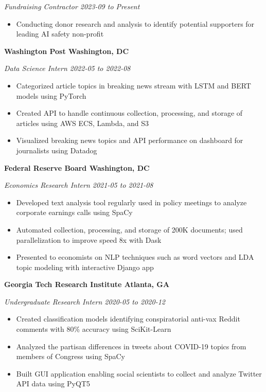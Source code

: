 \documentclass{article}
\newcommand{\headingTwo}[2]{
    \vspace*{6pt}
    \textbf{#1 \hfill #2}
}
\newcommand{\headingThree}[2]{
    \vspace*{2pt}
    \textsl{#1 \hfill #2}
}
\begin{document}
\headingThree{Fundraising Contractor}{2023-09 to Present}
\begin{itemize}
    \item Conducting donor research and analysis to identify potential supporters for leading AI safety non-profit
\end{itemize}


\headingTwo{Washington Post}{Washington, DC}

\headingThree{Data Science Intern}{2022-05 to 2022-08}
\begin{itemize}
    \item Categorized article topics in breaking news stream with LSTM and BERT models using PyTorch
    \item Created API to handle continuous collection, processing, and storage of articles using AWS ECS, Lambda, and S3
    \item Visualized breaking news topics and API performance on dashboard for journalists using Datadog
\end{itemize}


\headingTwo{Federal Reserve Board}{Washington, DC}

\headingThree{Economics Research Intern}{2021-05 to 2021-08}
\begin{itemize}
    \item Developed text analysis tool regularly used in policy meetings to analyze corporate earnings calls using SpaCy
    \item Automated collection, processing, and storage of 200K documents; used parallelization to improve speed 8x with Dask
    \item Presented to economists on NLP techniques such as word vectors and LDA topic modeling with interactive Django app
\end{itemize}


\headingTwo{Georgia Tech Research Institute}{Atlanta, GA}

\headingThree{Undergraduate Research Intern}{2020-05 to 2020-12}
\begin{itemize}
    \item Created classification models identifying conspiratorial anti-vax Reddit comments with 80\% accuracy using SciKit-Learn
    \item Analyzed the partisan differences in tweets about COVID-19 topics from members of Congress using SpaCy
    \item Built GUI application enabling social scientists to collect and analyze Twitter API data using PyQT5
\end{itemize}
\end{document}
